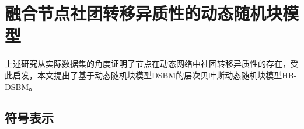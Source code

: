 




\section{融合节点社团转移异质性的动态随机块模型}
上述研究从实际数据集的角度证明了节点在动态网络中社团转移异质性的存在，受此启发，本文提出了基于动态随机块模型DSBM的层次贝叶斯动态随机块模型HB-DSBM。

\subsection{符号表示}



